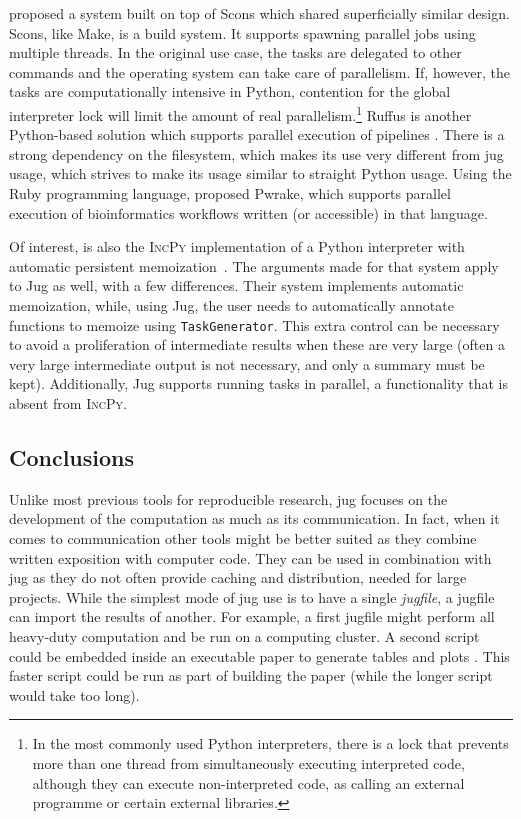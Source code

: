 \documentclass{article}
\begin{document}
\citet{Fomel2007} proposed a system built on top of Scons which shared
superficially similar design. Scons, like Make, is a build system. It supports
spawning parallel jobs using multiple threads. In the original use case, the
tasks are delegated to other commands and the operating system can take care of
parallelism. If, however, the tasks are computationally intensive in Python,
contention for the global interpreter lock will limit the amount of real
parallelism.\footnote{In the most commonly used Python interpreters, there is a
lock that prevents more than one thread from simultaneously executing
interpreted code, although they can execute non-interpreted code, as calling an
external programme or certain external libraries.} Ruffus is another
Python-based solution which supports parallel execution of pipelines
\citep{Goodstadt16092010}. There is a strong dependency on the filesystem,
which makes its use very different from jug usage, which strives to make its
usage similar to straight Python usage. Using the Ruby programming language,
\citet{mishima2011} proposed Pwrake, which supports parallel execution of
bioinformatics workflows written (or accessible) in that language.

Of interest, is also the \textsc{IncPy} implementation of a Python interpreter
with automatic persistent memoization~\cite{Guo_IncPy,Guo_IncPy_pre}. The
arguments made for that system apply to Jug as well, with a few differences.
Their system implements automatic memoization, while, using Jug, the user needs
to automatically annotate functions to memoize using \texttt{TaskGenerator}.
This extra control can be necessary to avoid a proliferation of intermediate
results when these are very large (often a very large intermediate output is
not necessary, and only a summary must be kept). Additionally, Jug supports
running tasks in parallel, a functionality that is absent from \textsc{IncPy}.

\subsection{Conclusions}

Unlike most previous tools for reproducible research, jug focuses on the
development of the computation as much as its communication. In fact, when it
comes to communication other tools might be better suited as they combine
written exposition with computer code. They can be used in combination with jug
as they do not often provide caching and distribution, needed for large
projects. While the simplest mode of jug use is to have a single
\textit{jugfile}, a jugfile can import the results of another. For example, a
first jugfile might perform all heavy-duty computation and be run on a
computing cluster. A second script could be embedded inside an executable paper
to generate tables and plots \citep{Delescluse2011}. This faster script could
be run as part of building the paper (while the longer script would take too
long).
\end{document}
